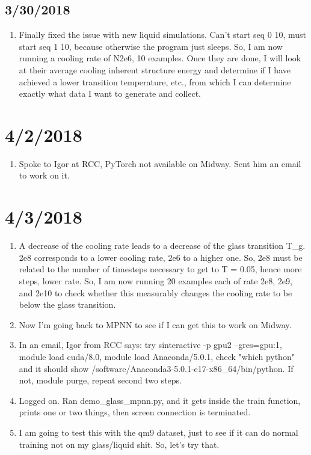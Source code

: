 \documentclass[12pt,reqno]{amsart}
\numberwithin{equation}{section}
\begin{document}
\subsection{3/30/2018}

\begin{enumerate}
\item Finally fixed the issue with new liquid simulations.  Can't start seq 0 10, must start seq 1 10, because otherwise the program just sleeps.  So, I am now running a cooling rate of N2e6, 10 examples.  Once they are done, I will look at their average cooling inherent structure energy and determine if I have achieved a lower transition temperature, etc., from which I can determine exactly what data I want to generate and collect.  
\end{enumerate}

\section{4/2/2018}

\begin{enumerate}
\item Spoke to Igor at RCC, PyTorch not available on Midway.  Sent him an email to work on it.  
\end{enumerate}

\section{4/3/2018}

\begin{enumerate}
\item A decrease of the cooling rate leads to a decrease of the glass transition T\_g.  2e8 corresponds to a lower cooling rate, 2e6 to a higher one.  So, 2e8 must be related to the number of timesteps necessary to get to T = 0.05, hence more steps, lower rate.  So, I am now running 20 examples each of rate 2e8, 2e9, and 2e10 to check whether this measurably changes the cooling rate to be below the glass transition.  
\item Now I'm going back to MPNN to see if I can get this to work on Midway.  
\item In an email, Igor from RCC says: try sinteractive -p gpu2 --gres=gpu:1, module load cuda/8.0, module load Anaconda/5.0.1, check "which python" and it should show /software/Anaconda3-5.0.1-e17-x86\_64/bin/python.  If not, module purge, repeat second two steps.  
\item Logged on.  Ran demo\_glass\_mpnn.py, and it gets inside the train function, prints one or two things, then screen connection is terminated.
\item I am going to test this with the qm9 dataset, just to see if it can do normal training not on my glass/liquid shit.  So, let's try that.  
\end{enumerate}
\end{document}
